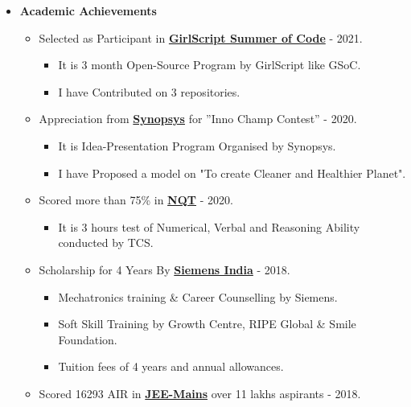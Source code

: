 \documentclass[10pt]{extarticle}
\begin{document}
\begin{itemize}
\item \textbf{Academic Achievements}
    \begin{itemize}
       \item Selected as Participant in \href{https://www.linkedin.com/posts/priyanka-soni-131668176_opensource-github-gssoc2021-activity-6768059710504628224-zK4j/}{\color{black}\textbf{GirlScript Summer of Code}} - 2021.
           \begin{itemize}
               \item It is 3 month Open-Source Program by GirlScript like GSoC.
               \item I have Contributed on 3 repositories.
           \end{itemize}
        \item Appreciation from \href{https://www.linkedin.com/posts/priyanka-soni-131668176_ideapresentationcontest-iot-innovation-activity-6743422132929343488-fRUb/}{\color{black}\textbf{Synopsys}} for ”Inno Champ Contest” - 2020.
          \begin{itemize}
              \item It is Idea-Presentation Program Organised by Synopsys.
              \item I have Proposed a model on "To create Cleaner and Healthier Planet".
          \end{itemize}
       \item Scored more than 75\% in \href{https://drive.google.com/file/d/1FfOOm94LawOPaGOGxPQHwiO4TyZkc5h6/view}{\color{black}\textbf{NQT}} - 2020.
         \begin{itemize}
           \item It is 3 hours test of Numerical, Verbal and Reasoning Ability conducted by TCS.
         \end{itemize}
       \item Scholarship for 4 Years By \href{https://drive.google.com/file/d/1XFUYs_kH-7Q7BmaebOLJVNOLyD0d4iTg/view}{\color{black}\textbf{Siemens India}} - 2018.
          \begin{itemize}
            \item Mechatronics training \& Career Counselling by Siemens.
            \item Soft Skill Training by Growth Centre, RIPE Global \& Smile Foundation.
            \item Tuition fees of 4 years and annual allowances.
          \end{itemize}
      \item Scored 16293 AIR in \href{https://drive.google.com/file/d/1ybuqeNcAqsaaAtMSv_K6zBx6bJwiuTa0/view}{\color{black}\textbf{JEE-Mains}} over 11 lakhs aspirants - 2018.

\end{itemize}
\end{itemize}
\end{document}
